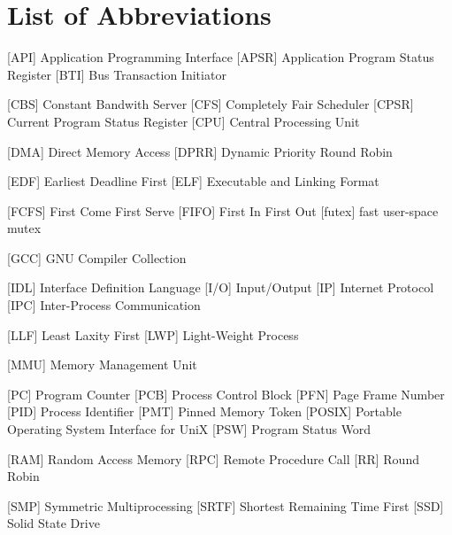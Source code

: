 
\chapter*{List of Abbreviations}

\begin{acronym} [POSIX]
 [API] {Application Programming Interface}
 [APSR] {Application Program Status Register}
 [BTI] {Bus Transaction Initiator}

 [CBS] {Constant Bandwith Server}
 [CFS] {Completely Fair Scheduler}
 [CPSR] {Current Program Status Register}
 [CPU] {Central Processing Unit}

 [DMA] {Direct Memory Access}
 [DPRR] {Dynamic Priority Round Robin}

 [EDF] {Earliest Deadline First}
 [ELF] {Executable and Linking Format}

 [FCFS] {First Come First Serve}
 [FIFO] {First In First Out}
 [futex] {fast user-space mutex}

 [GCC] {GNU Compiler Collection}


 [IDL] {Interface Definition Language}
 [I/O] {Input/Output}
 [IP] {Internet Protocol}
[IPC] {Inter-Process Communication}



 [LLF] {Least Laxity First}
 [LWP] {Light-Weight Process}

 [MMU] {Memory Management Unit}



 [PC] {Program Counter}
 [PCB] {Process Control Block}
 [PFN] {Page Frame Number}
 [PID] {Process Identifier}
 [PMT] {Pinned Memory Token}
 [POSIX] {Portable Operating System Interface for UniX}
 [PSW] {Program Status Word}


  [RAM] {Random Access Memory}
 [RPC] {Remote Procedure Call}
 [RR] {Round Robin}

 [SMP] {Symmetric Multiprocessing}
 [SRTF] {Shortest Remaining Time First}
 [SSD] {Solid State Drive}


\end{acronym}
